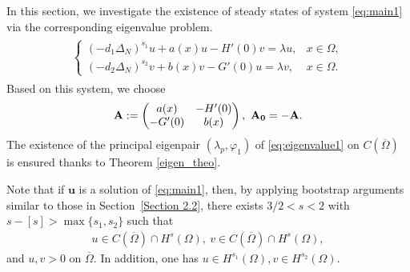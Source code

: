 \documentclass[a4paper,11pt]{amsart}
\theoremstyle{definition}
\def\O{\Omega}
\numberwithin{equation}{section}
\theoremstyle{definition}
\def\O{\Omega}
\begin{document}
In this section, we investigate the existence of steady states of system \eqref{eq:main1} via the corresponding eigenvalue problem.
\begin{align}\label{eq:eigenvalue1}
\begin{split}
\left\{\begin{array}{lllll}
(-d_1\Delta_N)^{s_1}u+a(x)u-H'(0)v=\lambda u ,&x\in \O, \\
(-d_2\Delta_N)^{s_2}v+b(x)v-G'(0)u=\lambda v,&x\in \O.
\end{array}\right.
\end{split}
\end{align}
Based on this system, we choose
\begin{align*}
\textbf{A}:=\begin{pmatrix}
a(x)&-H'(0)\\
-G'(0)&b(x)
\end{pmatrix},~{\bf A_0}=-\textbf{A}.
\end{align*}
The existence of the principal eigenpair $(\lambda_p,\varphi_1)$ of \eqref{eq:eigenvalue1} on $C(\overline{\O})$ is ensured thanks to Theorem \ref{eigen_theo}.
%

Note that if $\mathbf{u}$ is a solution of \eqref{eq:main1}, then, by applying bootstrap arguments similar to those in Section~\ref{Section 2.2}, there exists $3/2 < s < 2$ with $s-[s] > \max\{s_1, s_2\}$ such that
\begin{align*}
u\in C(\overline{\O})\cap H^{s}(\O),~v\in C(\overline{\O})\cap H^{s}(\O),
\end{align*}
and $u,v>0$ on $\overline{\O}$. In addition, one has $u\in H^{s_1}(\O),v\in H^{s_2}(\O)$.
\end{document}
